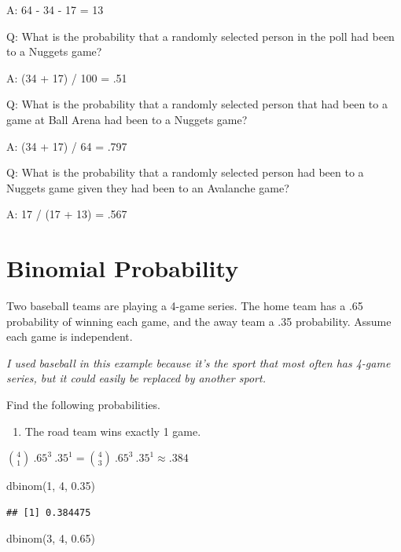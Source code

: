 \documentclass[
  11pt,
]{book}
\newenvironment{Shaded}{\begin{snugshade}}{\end{snugshade}}
\newcommand{\DecValTok}[1]{\textcolor[rgb]{0.00,0.00,0.81}{#1}}
\newcommand{\FloatTok}[1]{\textcolor[rgb]{0.00,0.00,0.81}{#1}}
\newcommand{\FunctionTok}[1]{\textcolor[rgb]{0.00,0.00,0.00}{#1}}
\newcommand{\NormalTok}[1]{#1}
\providecommand{\tightlist}{%
  \setlength{\itemsep}{0pt}\setlength{\parskip}{0pt}}
\theoremstyle{definition}
\theoremstyle{definition}
\theoremstyle{definition}
\theoremstyle{definition}
\theoremstyle{remark}
\begin{document}
A: 64 - 34 - 17 = 13

Q: What is the probability that a randomly selected person in the poll had been to a Nuggets game?

A: (34 + 17) / 100 = .51

Q: What is the probability that a randomly selected person that had been to a game at Ball Arena had been to a Nuggets game?

A: (34 + 17) / 64 = .797

Q: What is the probability that a randomly selected person had been to a Nuggets game given they had been to an Avalanche game?

A: 17 / (17 + 13) = .567

\hypertarget{binomial-probability-1}{%
\section{Binomial Probability}\label{binomial-probability-1}}

Two baseball teams are playing a 4-game series. The home team has a .65 probability of winning each game, and the away team a .35 probability. Assume each game is independent.

\emph{I used baseball in this example because it's the sport that most often has 4-game series, but it could easily be replaced by another sport.}

Find the following probabilities.

\begin{enumerate}
\def\labelenumi{(\alph{enumi})}
\tightlist
\item
  The road team wins exactly 1 game.
\end{enumerate}

\(\binom{4}{1}\ .65^3\ .35^1 = \binom{4}{3}\ .65^3\ .35^1 \approx .384\)

\begin{Shaded}
\begin{Highlighting}[]
\FunctionTok{dbinom}\NormalTok{(}\DecValTok{1}\NormalTok{, }\DecValTok{4}\NormalTok{, }\FloatTok{0.35}\NormalTok{)}
\end{Highlighting}
\end{Shaded}

\begin{verbatim}
## [1] 0.384475
\end{verbatim}

\begin{Shaded}
\begin{Highlighting}[]
\FunctionTok{dbinom}\NormalTok{(}\DecValTok{3}\NormalTok{, }\DecValTok{4}\NormalTok{, }\FloatTok{0.65}\NormalTok{)}
\end{Highlighting}
\end{Shaded}
\end{document}
